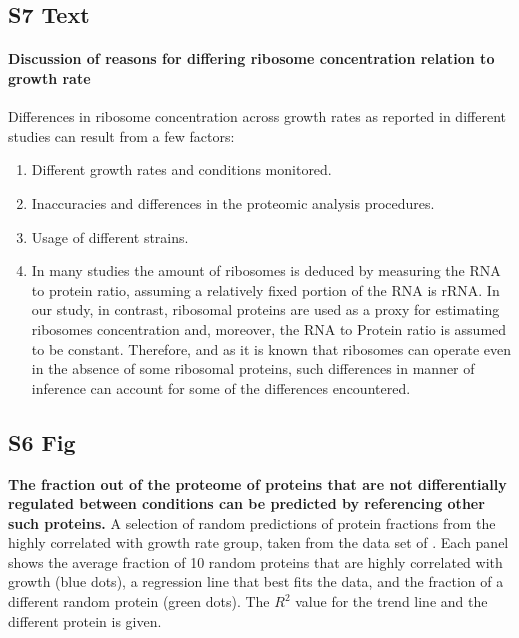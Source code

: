 \documentclass[10pt,letterpaper]{article}
\begin{document}
\subsection*{S7 Text}
\label{ribosomeconc}
\paragraph{Discussion of reasons for differing ribosome concentration relation to growth rate}

Differences in ribosome concentration  across growth rates as reported in different studies can result from a few factors:
\begin{enumerate}
\item Different growth rates and conditions monitored.
\item Inaccuracies and differences in the proteomic analysis procedures.
\item Usage of different strains.
\item In many studies the amount of ribosomes is deduced by measuring the RNA to protein ratio, assuming a relatively fixed portion of the RNA is rRNA.
In our study, in contrast, ribosomal proteins are used as a proxy for estimating ribosomes concentration and, moreover, the RNA to Protein ratio is assumed to be constant.
Therefore, and as it is known that ribosomes can operate even in the absence of some ribosomal proteins, such differences in manner of inference can account for some of the differences encountered.
\end{enumerate}

\subsection*{S6 Fig}
\label{fig:randpred}
    {\bf The fraction out of the proteome of proteins that are not differentially regulated between conditions can be predicted by referencing other such proteins.}
  A selection of random predictions of protein fractions from the highly correlated with growth rate group, taken from the data set of \cite{Schmidt2015}.
  Each panel shows the average fraction of 10 random proteins that are highly correlated with growth (blue dots), a regression line that best fits the data, and the fraction of a different random protein (green dots).
  The $R^2$ value for the trend line and the different protein is given.
%
\end{document}
